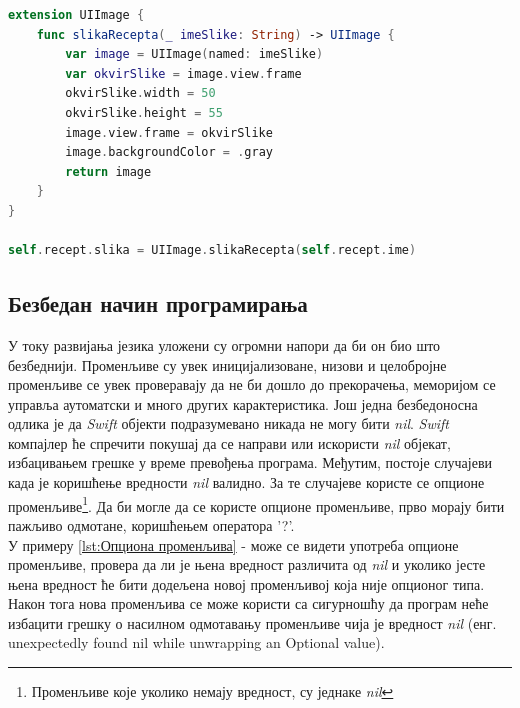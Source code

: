 \documentclass[12pt,oneside]{memoir}
\begin{document}
\begin{lstlisting}[caption=\textit{{Надоградња Swift класе}}, label={lst:Надоградња Swift класе}, language=Swift, frame=single]
extension UIImage {
    func slikaRecepta(_ imeSlike: String) -> UIImage {
        var image = UIImage(named: imeSlike)
        var okvirSlike = image.view.frame
        okvirSlike.width = 50
        okvirSlike.height = 55
        image.view.frame = okvirSlike
        image.backgroundColor = .gray
        return image
    }
}

self.recept.slika = UIImage.slikaRecepta(self.recept.ime)
\end{lstlisting}

\subsection{Безбедан начин програмирања}

\indent У току развијања језика уложени су огромни напори да би он био што безбеднији. Променљиве су увек иницијализоване, низови и целобројне променљиве се увек проверавају да не би дошло до прекорачења, меморијом се управља аутоматски и много других карактеристика.
Још једна безбедоносна одлика је да \textit{Swift} објекти подразумевано никада не могу бити \textit{nil}. \textit{Swift} компајлер ће спречити покушај да се направи или искористи \textit{nil} објекат, избацивањем грешке у време превођења програма.
Међутим, постоје случајеви када је коришћење вредности \textit{nil} валидно. За те случајеве користе се опционе променљиве\footnote{Променљиве које уколико немају вредност, су једнаке \textit{nil}}. Да би могле да се користе опционе променљиве, прво морају бити пажљиво одмотане, коришћењем оператора '?'.
\\
\indent У примеру \ref{lst:Опциона променљива} -  може се видети употреба опционе променљиве, провера да ли је њена вредност различита од \textit{nil} и уколико јесте њена вредност ће бити додељена новој променљивој која није опционог типа. Након тога нова променљива се може користи са сигурношћу да програм неће избацити грешку о насилном одмотавању променљиве чија је вредност \textit{nil} (енг. unexpectedly found nil while unwrapping an Optional value).
\end{document}
